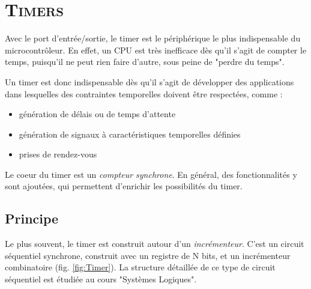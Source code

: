 \chapter{\textsc{Timers}}

Avec le port d'entrée/sortie, le timer est le périphérique le plus indispensable du microcontrôleur. En effet, un CPU est très inefficace dès qu'il s'agit de compter le temps, puisqu'il ne peut rien faire d'autre, sous peine de "perdre du temps".

Un timer est donc indispensable dès qu'il s'agit de développer des applications dans lesquelles des contraintes temporelles doivent être respectées, comme :
\begin{itemize}[label=\textbullet,font=\small]
\item génération de délais ou de temps d'attente
\item génération de signaux à caractéristiques temporelles définies
\item prises de rendez-vous
\end{itemize}

Le coeur du timer est un \textit{compteur synchrone}. En général, des fonctionnalités y sont ajoutées, qui permettent d'enrichir les possibilités du timer.

\section{Principe}
Le plus souvent, le timer est construit autour d'un \textit{incrémenteur}. C'est un circuit séquentiel synchrone, construit avec un registre de N bits, et un incrémenteur combinatoire (fig. \ref{fig:Timer}). La structure détaillée de ce type de circuit séquentiel est étudiée au cours "Systèmes Logiques".


